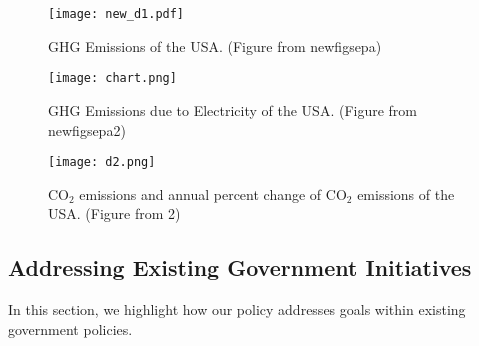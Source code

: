\begin{figure}
\begin{center}
\texttt{[image: new\_d1.pdf]}
\caption{GHG Emissions of the USA. (Figure from \cite{deb}{newfigsepa})}
\label{d1}
\end{center}
\end{figure}

\begin{figure}
\begin{center}
\texttt{[image: chart.png]}
\caption{GHG Emissions due to Electricity of the USA. (Figure from \cite{deb}{newfigsepa2})}
\label{d1}
\end{center}
\end{figure}

\begin{figure}
\begin{center}
\texttt{[image: d2.png]}
\caption{CO$_{2}$ emissions and annual percent change of CO$_{2}$ emissions of the USA. (Figure from \cite{deb}{2})}
\label{d2}
\end{center}
\end{figure}

\subsection{Addressing Existing Government Initiatives}
In this section, we highlight how our policy addresses goals within existing government policies.

